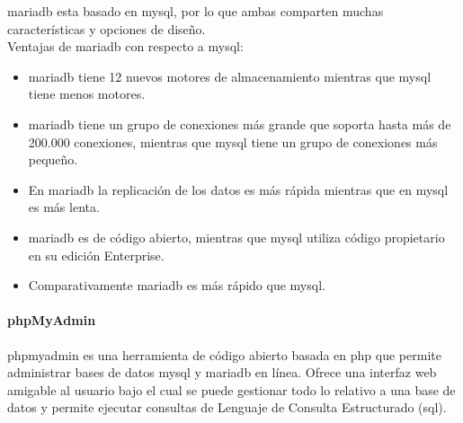 \documentclass[../../main.tex]{subfiles}
\begin{document}
\gls{mariadb} esta basado en \gls{mysql}, por lo que ambas comparten muchas características y opciones de diseño.  \\

Ventajas de \gls{mariadb} con respecto a \gls{mysql}:
\begin{itemize}
    \item \gls{mariadb} tiene 12 nuevos motores de almacenamiento mientras que \gls{mysql} tiene menos motores.
    \item \gls{mariadb} tiene un grupo de conexiones más grande que soporta hasta más de 200.000 conexiones, mientras que \gls{mysql} tiene un grupo de conexiones más pequeño.
    \item En \gls{mariadb} la replicación de los datos es más rápida mientras que en \gls{mysql} es más lenta.
    \item \gls{mariadb} es de código abierto, mientras que \gls{mysql} utiliza código propietario en su edición Enterprise.
    \item Comparativamente \gls{mariadb} es más rápido que \gls{mysql}.
\end{itemize}

\paragraph{phpMyAdmin}
\gls{phpmyadmin}\cite{doc12} es una herramienta de código abierto basada en \gls{php} que permite administrar bases de datos \gls{mysql} y \gls{mariadb} en línea. Ofrece una interfaz web amigable al usuario bajo el cual se puede gestionar todo lo relativo a una base de datos y permite ejecutar consultas de Lenguaje de Consulta Estructurado (\gls{sql}).
\end{document}
